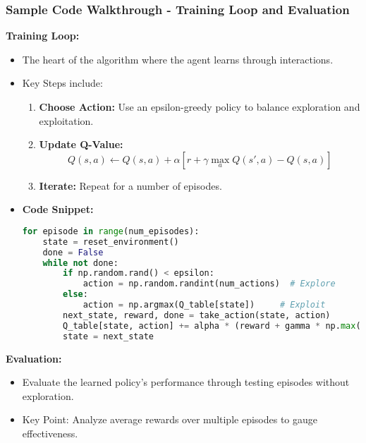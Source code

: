 \documentclass[aspectratio=169]{beamer}
\begin{document}
\begin{frame}[fragile]
    \frametitle{Sample Code Walkthrough - Training Loop and Evaluation}
    \textbf{Training Loop:}
    \begin{itemize}
        \item The heart of the algorithm where the agent learns through interactions.
        \item Key Steps include:
        \begin{enumerate}
            \item \textbf{Choose Action:} Use an epsilon-greedy policy to balance exploration and exploitation.
            \item \textbf{Update Q-Value:} 
            \begin{equation}
            Q(s, a) \leftarrow Q(s, a) + \alpha \left[r + \gamma \max_a Q(s', a) - Q(s, a)\right]
            \end{equation}
            \item \textbf{Iterate:} Repeat for a number of episodes.
        \end{enumerate}
        \item \textbf{Code Snippet:}
        \begin{lstlisting}[language=Python]
for episode in range(num_episodes):
    state = reset_environment()
    done = False
    while not done:
        if np.random.rand() < epsilon:
            action = np.random.randint(num_actions)  # Explore
        else:
            action = np.argmax(Q_table[state])     # Exploit
        next_state, reward, done = take_action(state, action)
        Q_table[state, action] += alpha * (reward + gamma * np.max(Q_table[next_state]) - Q_table[state, action])
        state = next_state
        \end{lstlisting}
    \end{itemize}
    
    \textbf{Evaluation:}
    \begin{itemize}
        \item Evaluate the learned policy's performance through testing episodes without exploration.
        \item Key Point: Analyze average rewards over multiple episodes to gauge effectiveness.
    \end{itemize}
\end{frame}
\end{document}
